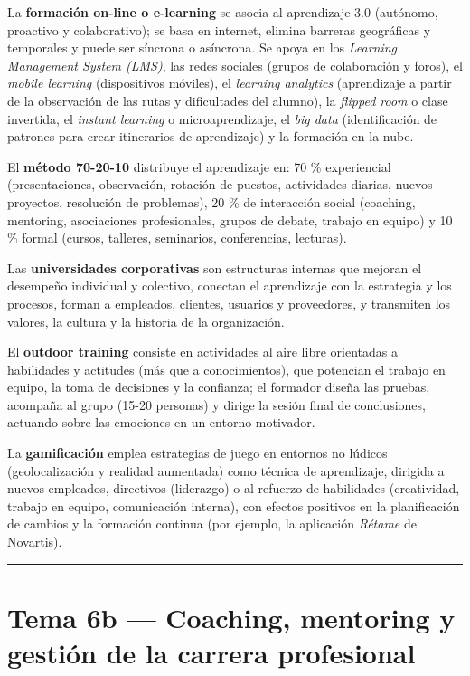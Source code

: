 \documentclass[12pt]{book} %
\begin{document}
La \textbf{formación on-line o e-learning} se asocia al aprendizaje 3.0
(autónomo, proactivo y colaborativo); se basa en internet, elimina
barreras geográficas y temporales y puede ser síncrona o asíncrona. Se
apoya en los \emph{Learning Management System (LMS)}, las redes sociales
(grupos de colaboración y foros), el \emph{mobile learning}
(dispositivos móviles), el \emph{learning analytics} (aprendizaje a
partir de la observación de las rutas y dificultades del alumno), la
\emph{flipped room} o clase invertida, el \emph{instant learning} o
microaprendizaje, el \emph{big data} (identificación de patrones para
crear itinerarios de aprendizaje) y la formación en la nube.

El \textbf{método 70-20-10} distribuye el aprendizaje en: 70 \%
experiencial (presentaciones, observación, rotación de puestos,
actividades diarias, nuevos proyectos, resolución de problemas), 20 \%
de interacción social (coaching, mentoring, asociaciones profesionales,
grupos de debate, trabajo en equipo) y 10 \% formal (cursos, talleres,
seminarios, conferencias, lecturas).

Las \textbf{universidades corporativas} son estructuras internas que
mejoran el desempeño individual y colectivo, conectan el aprendizaje con
la estrategia y los procesos, forman a empleados, clientes, usuarios y
proveedores, y transmiten los valores, la cultura y la historia de la
organización.

El \textbf{outdoor training} consiste en actividades al aire libre
orientadas a habilidades y actitudes (más que a conocimientos), que
potencian el trabajo en equipo, la toma de decisiones y la confianza; el
formador diseña las pruebas, acompaña al grupo (15-20 personas) y dirige
la sesión final de conclusiones, actuando sobre las emociones en un
entorno motivador.

La \textbf{gamificación} emplea estrategias de juego en entornos no
lúdicos (geolocalización y realidad aumentada) como técnica de
aprendizaje, dirigida a nuevos empleados, directivos (liderazgo) o al
refuerzo de habilidades (creatividad, trabajo en equipo, comunicación
interna), con efectos positivos en la planificación de cambios y la
formación continua (por ejemplo, la aplicación \emph{Rétame} de
Novartis).

\begin{center}\rule{0.5\linewidth}{0.5pt}\end{center}

\hypertarget{tema-6b-coaching-mentoring-y-gestiuxf3n-de-la-carrera-profesional}{%
\chapter{Tema 6b --- Coaching, mentoring y gestión de la carrera
profesional}\label{tema-6b-coaching-mentoring-y-gestiuxf3n-de-la-carrera-profesional}}
\end{document}
